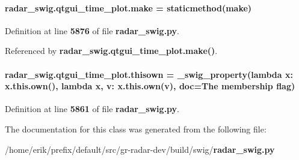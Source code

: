\paragraph[{make}]{\setlength{\rightskip}{0pt plus 5cm}radar\+\_\+swig.\+qtgui\+\_\+time\+\_\+plot.\+make = staticmethod(make)\hspace{0.3cm}{\ttfamily [static]}}\label{classradar__swig_1_1qtgui__time__plot_ad20409513b2df1b3c69ec8533199ccfe}


Definition at line {\bf 5876} of file {\bf radar\+\_\+swig.\+py}.



Referenced by {\bf radar\+\_\+swig.\+qtgui\+\_\+time\+\_\+plot.\+make()}.

\paragraph[{thisown}]{\setlength{\rightskip}{0pt plus 5cm}radar\+\_\+swig.\+qtgui\+\_\+time\+\_\+plot.\+thisown = {\bf \+\_\+swig\+\_\+property}(lambda x\+: x.\+this.\+own(), lambda {\bf x}, v\+: x.\+this.\+own(v), doc=\textquotesingle{}The membership flag\textquotesingle{})\hspace{0.3cm}{\ttfamily [static]}}\label{classradar__swig_1_1qtgui__time__plot_a3b81cd70d10e329582f8a825bd7ba078}


Definition at line {\bf 5861} of file {\bf radar\+\_\+swig.\+py}.



The documentation for this class was generated from the following file\+:\begin{DoxyCompactItemize}
\item 
/home/erik/prefix/default/src/gr-\/radar-\/dev/build/swig/{\bf radar\+\_\+swig.\+py}\end{DoxyCompactItemize}
